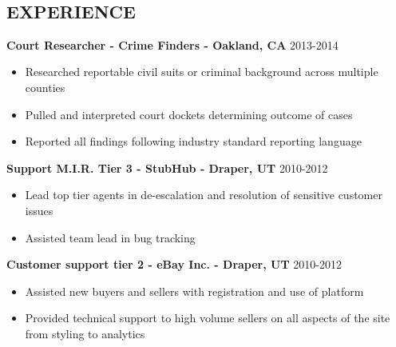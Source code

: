 \documentclass[line,margin]{res}
\begin{document}
\date{\today}
\address{\href{mailto:jefferycoombs@gmail.com}{jefferycoombs@gmail.com} \\ (415) 483-6437}\\

\begin{resume}

\section{EXPERIENCE}
 {\bf Court Researcher - Crime Finders - Oakland, CA} \hfill 2013-2014\\
  \begin{itemize} \itemsep -2pt %
  \item Researched reportable civil suits or criminal background across multiple counties
  \item Pulled and interpreted court dockets determining outcome of cases
  \item Reported all findings following industry standard reporting language
  \end{itemize}
 {\bf Support M.I.R. Tier 3 - StubHub - Draper, UT} \hfill 2010-2012\\
  \begin{itemize} \itemsep -2pt %
  \item Lead top tier agents in de-escalation and resolution of sensitive customer issues
  \item Assisted team lead in bug tracking
  \end{itemize}
 {\bf Customer support tier 2 - eBay Inc. - Draper, UT} \hfill 2010-2012\\
   \begin{itemize} \itemsep -2pt
   \item Assisted new buyers and sellers with registration and use of platform
   \item Provided technical support to high volume sellers on all aspects of the site from styling to analytics

\end{itemize}
\end{resume}
\end{document}
